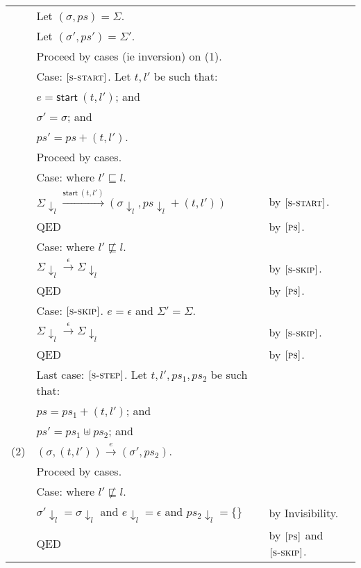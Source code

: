 \documentclass{article}
\newcommand{\rn}[1]{\text{\textsc{[#1]}}}
\newcommand{\tsteparrow}[1]{\overset{#1}{\longrightarrow}}
\newcommand{\tstep}[3]{#2\tsteparrow{#1}#3}
\newcommand{\ssteparrow}[1]{\overset{#1}{\longrightarrow}}
\newcommand{\sstep}[3]{#2\ssteparrow{#1}#3}
\newcommand{\process}[2]{(#1,#2)}
\newcommand{\evstart}[1]{\textsf{start}~#1}
\newcommand{\proj}[2]{#1{\downarrow_{#2}}}
\begin{document}
\begin{tabular}{l@{$\qquad$}l@{$\qquad$}l}
        & Let $(\sigma, ps) = \Sigma$.
\\
        & Let $(\sigma', ps') = \Sigma'$.
\\
        & Proceed by cases (ie inversion) on (1).
\\
        & Case: $\rn{s-start}$. Let $t,l'$ be such that:
\\
        & \z $e=\evstart{\process{t}{l'}}$; and
\\
        & \z $\sigma'=\sigma$; and
\\
        & \z $ps'=ps+\process{t}{l'}$.
\\
        & \z Proceed by cases.
\\
        & \z Case: where $l'\sqsubseteq l$.
\\
        & \z \z $\sstep{\evstart{\process{t}{l'}}}{\proj{\Sigma}{l}}{(\proj{\sigma}{l},\proj{ps}{l}+\process{t}{l'})}$
        & by  $\rn{s-start}$.
\\
        & \z \z QED
        & by  $\rn{ps}$.
\\
       & \z Case: where $l'\not\sqsubseteq l$.
\\
        & \z \z $\sstep{\epsilon}{\proj{\Sigma}{l}}{\proj{\Sigma}{l}}$
        & by  $\rn{s-skip}$.
\\
        & \z \z QED
        & by  $\rn{ps}$.
\\
        & Case: $\rn{s-skip}$. $e=\epsilon$ and $\Sigma'=\Sigma$.
\\
        & \z $\sstep{\epsilon}{\proj{\Sigma}{l}}{\proj{\Sigma}{l}}$
        & by  $\rn{s-skip}$.
\\
        & \z QED
        & by  $\rn{ps}$.
\\
        & Last case: $\rn{s-step}$. Let $t,l',ps_1,ps_2$ be such that:
\\
        & $ps=ps_1+\process{t}{l'}$; and
\\
        & $ps'=ps_1\uplus ps_2$; and
\\
  (2)   & $\tstep{e}{(\sigma,\process{t}{l'})}{(\sigma',ps_2)}$.
\\
        & Proceed by cases.
\\
        & Case: where $l'\not\sqsubseteq l$.
\\
        & \z $\proj{\sigma'}{l}=\proj{\sigma}{l}$ and $\proj{e}{l}=\epsilon$ and $\proj{ps_2}{l}=\{\}$
        & by Invisibility.
\\
        & \z QED
        & by  $\rn{ps}$ and $\rn{s-skip}$.
\\

\end{tabular}
\end{document}
